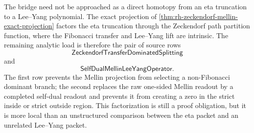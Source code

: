 \begin{principle}
\label{prin:rh-mellin-factorization-bridge-load}
The bridge need not be approached as a direct homotopy from an eta
truncation to a Lee--Yang polynomial.  The exact projection of
\autoref{thm:rh-zeckendorf-mellin-exact-projection} factors the eta
truncation through the Zeckendorf path partition function, where the
Fibonacci transfer and Lee--Yang lift are intrinsic.  The remaining
analytic load is therefore the pair of source rows
$$
\mathsf{ZeckendorfTransferDominatedSplitting}
$$
and
$$
\mathsf{SelfDualMellinLeeYangOperator}.
$$
The first row prevents the Mellin projection from selecting a
non-Fibonacci dominant branch; the second replaces the raw one-sided
Mellin readout by a completed self-dual readout and prevents it from
creating a zero in the strict inside or strict outside region.  This
factorization is still a proof obligation, but it is more local than an
unstructured comparison between the eta packet and an unrelated
Lee--Yang packet.
\end{principle}
